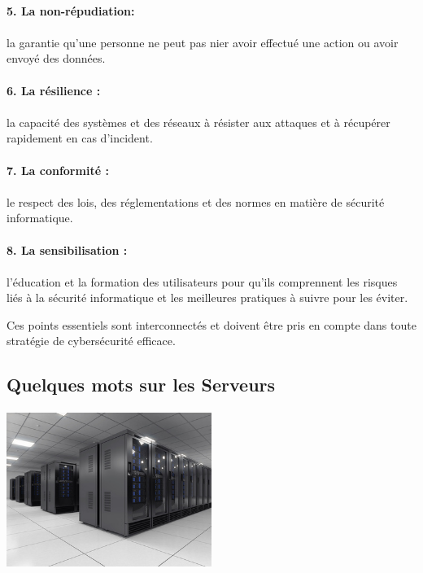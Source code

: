 \documentclass{report}
\begin{document}
\paragraph{5. La non-répudiation: } \paragraph{}la garantie qu'une personne ne peut pas nier avoir effectué une action ou avoir envoyé des données.

\paragraph{6. La résilience :} \paragraph{}la capacité des systèmes et des réseaux à résister aux attaques et à récupérer rapidement en cas d'incident.
\pagebreak

\paragraph{7. La conformité :} \paragraph{}le respect des lois, des réglementations et des normes en matière de sécurité informatique.

\paragraph{8. La sensibilisation :}\paragraph{} l'éducation et la formation des utilisateurs pour qu'ils comprennent les risques liés à la sécurité informatique et les meilleures pratiques à suivre pour les éviter.

Ces points essentiels sont interconnectés et doivent être pris en compte dans toute stratégie de cybersécurité efficace.
  \subsection {Quelques mots sur  les Serveurs }
  \vspace{4mm}
  \paragraph{ \includegraphics[width=0.5\textwidth]{salle-serveur.jpg}}
\end{document}
